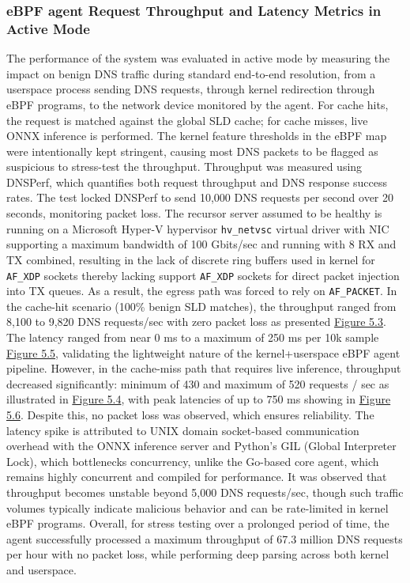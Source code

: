 \documentclass [11pt, proquest] {uwthesis}[2020/02/24]
\begin{document}
\subsubsection{eBPF agent Request Throughput and Latency Metrics in Active Mode}
The performance of the system was evaluated in active mode by measuring the impact on benign DNS traffic during standard end-to-end resolution, from a userspace process sending DNS requests, through kernel redirection through eBPF programs, to the network device monitored by the agent. For cache hits, the request is matched against the global SLD cache; for cache misses, live ONNX inference is performed. The kernel feature thresholds in the eBPF map were intentionally kept stringent, causing most DNS packets to be flagged as suspicious to stress-test the throughput. Throughput was measured using DNSPerf, which quantifies both request throughput and DNS response success rates. The test locked DNSPerf to send 10,000 DNS requests per second over 20 seconds, monitoring packet loss. The recursor server assumed to be healthy is running on a Microsoft Hyper-V hypervisor \texttt{hv\_netvsc} virtual driver with NIC supporting a maximum bandwidth of 100 Gbits/sec and running with 8 RX and TX combined, resulting in the lack of discrete ring buffers used in kernel for \texttt{AF\_XDP} sockets thereby lacking support \texttt{AF\_XDP} sockets for direct packet injection into TX queues. As a result, the egress path was forced to rely on \texttt{AF\_PACKET}. In the cache-hit scenario (100\% benign SLD matches), the throughput ranged from 8,100 to 9,820 DNS requests/sec with zero packet loss as presented \hyperref[fig:throughput_gsld]{Figure 5.3}. The latency ranged from near 0 ms to a maximum of 250 ms per 10k sample \hyperlink{fig:latency_gsld}{Figure 5.5}, validating the lightweight nature of the kernel+userspace eBPF agent pipeline. However, in the cache-miss path that requires live inference, throughput decreased significantly: minimum of 430 and maximum of 520 requests / sec as illustrated in \hyperref[fig:throughput_onnx]{Figure 5.4}, with peak latencies of up to 750 ms showing in \hyperref[fig:latency_onnx]{Figure 5.6}. Despite this, no packet loss was observed, which ensures reliability. The latency spike is attributed to UNIX domain socket-based communication overhead with the ONNX inference server and Python’s GIL (Global Interpreter Lock), which bottlenecks concurrency, unlike the Go-based core agent, which remains highly concurrent and compiled for performance.
It was observed that throughput becomes unstable beyond 5,000 DNS requests/sec, though such traffic volumes typically indicate malicious behavior and can be rate-limited in kernel eBPF programs. Overall, for stress testing over a prolonged period of time, the agent successfully processed a maximum throughput of 67.3 million DNS requests per hour with no packet loss, while performing deep parsing across both kernel and userspace.
\end{document}
